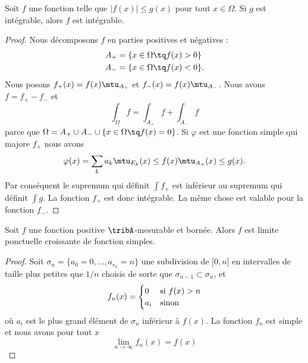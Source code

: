 \begin{lemma}   \label{LemPfHgal}
    Soit \( f\) une fonction telle que \( | f(x)|\leq g(x) \) pour tout \( x\in\Omega\). Si \( g\) est intégrable, alors \( f\) est intégrable.
\end{lemma}

\begin{proof}
    Nous décomposons \( f\) en parties positives et négatives :
    \begin{subequations}
        \begin{align}
            A_+&=\{ x\in\Omega\tq f(x)>0 \}\\
            A_-&=\{ x\in\Omega\tq f(x)<0 \}.
        \end{align}
    \end{subequations}
    Nous posons \( f_+(x)=f(x)\mtu_{A_+}\) et \( f_-(x)=f(x)\mtu_{A_-}\). Nous avons \( f=f_+-f_-\) et
    \begin{equation}
        \int_{\Omega}f=\int_{A_+}f+\int_{A_-}f
    \end{equation}
    parce que \( \Omega=A_+\cup A_-\cup\{ x\in\Omega\tq f(x)=0 \}\). Si \( \varphi\) est une fonction simple qui majore \( f_+\) nous avons
    \begin{equation}
        \varphi(x)=\sum_{k}a_k\mtu_{E_k}(x)\leq f(x)\mtu_{A_+}(x)\leq g(x).
    \end{equation}
    Par conséquent le supremum qui définit \( \int f_+\) est inférieur au supremum qui définit \( \int g\). La fonction \( f_+\) est donc intégrable. La même chose est valable pour la fonction \( f_-\).
\end{proof}

\begin{proposition} \label{PropWBavIf}
    Soit \( f\) une fonction positive \( \tribA\)-mesurable et bornée. Alors \( f\) est limite ponctuelle croissante de fonction simples.
\end{proposition}

\begin{proof}
    Soit \( \sigma_n=\{ a_0=0,\ldots, a_{r_n}=n \}\) une subdivision de \( \mathopen[ 0 , n \mathclose]\) en intervalles de taille plus petites que \( 1/n\) choisis de sorte que \( \sigma_{n-1}\subset\sigma_{n}\), et
    \begin{equation}
        f_n(x)=\begin{cases}
            0    &   \text{si \( f(x)>n\)}\\
            a_i    &    \text{sinon}
        \end{cases}
    \end{equation}
    où \( a_i\) est le plus grand élément de \( \sigma_n\) inférieur à \( f(x)\). La fonction \( f_n\) est simple et nous avons pour tout \( x\)
    \begin{equation}
        \lim_{n\to \infty} f_n(x)=f(x)
    \end{equation}
\end{proof}

